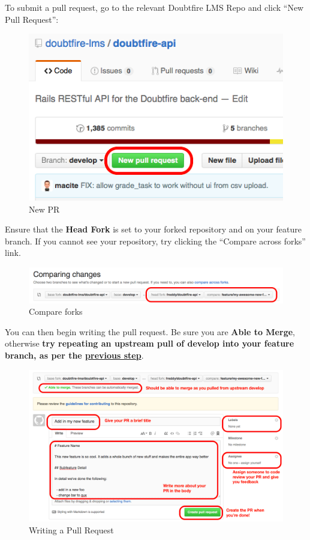 \documentclass[12pt,a4paper,]{article}
\begin{document}
To submit a pull request, go to the relevant Doubtfire LMS Repo and
click ``New Pull Request'':

\begin{figure}[htbp]
\centering
\includegraphics{77cd489a7f.png}
\caption{New PR}
\end{figure}

Ensure that the \textbf{Head Fork} is set to your forked repository and
on your feature branch. If you cannot see your repository, try clicking
the ``Compare across forks'' link.

\begin{figure}[htbp]
\centering
\includegraphics{22d554103e.png}
\caption{Compare forks}
\end{figure}

You can then begin writing the pull request. Be sure you are
\textbf{Able to Merge}, otherwise \textbf{try repeating an upstream pull
of develop into your feature branch, as per the
\protect\hyperlink{3-prepare-for-a-pull-request}{previous step}}.

\begin{figure}[htbp]
\centering
\includegraphics{8d3c8789a6.png}
\caption{Writing a Pull Request}
\end{figure}
\end{document}
